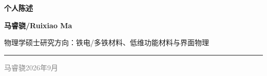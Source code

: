 \documentclass[11pt,a4paper]{article}
\newcommand{\ApplicantName}{马睿骁}
\newcommand{\EnglishName}{Ruixiao Ma}
\newcommand{\CurrentMajor}{物理学硕士}
\newcommand{\TargetField}{铁电/多铁材料、低维功能材料与界面物理}
\begin{document}
\begin{center}
  {\sffamily\fontsize{22}{26}\selectfont\bfseries\color{StatementNavy} 个人陈述}\par
  \vspace{0.35em}
  {\sffamily\large\bfseries\color{StatementTeal}\ApplicantName\enskip /\enskip \EnglishName}\par
  \vspace{0.25em}
  {\sffamily\small \CurrentMajor\enskip\textperiodcentered\enskip 研究方向：\TargetField}\par
  \vspace{0.6em}
  {\color{StatementGold}\rule{\linewidth}{1.1pt}}
\end{center}
\vspace{0.35em}



\vfill
\begin{flushright}
\sffamily\small\textcolor{gray}{\ApplicantName\quad 2026年9月}
\end{flushright}
\end{document}
